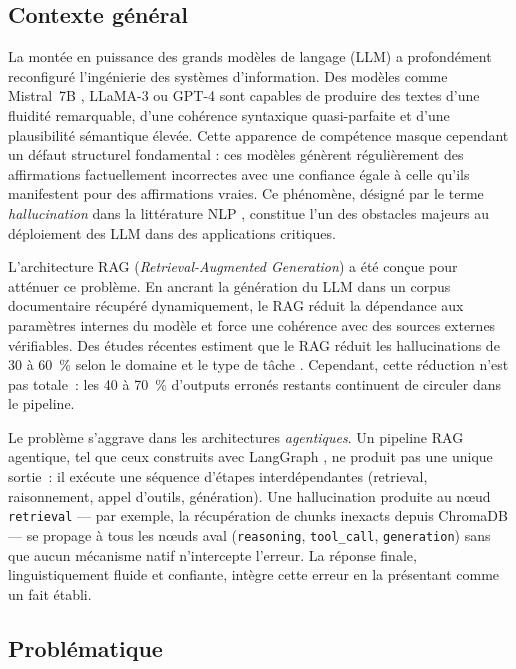 \documentclass[12pt,a4paper]{article}
\begin{document}
\subsection{Contexte général}

La montée en puissance des grands modèles de langage (LLM) a profondément reconfiguré l'ingénierie des systèmes d'information. Des modèles comme Mistral~7B \cite{jiang2023mistral}, LLaMA-3 ou GPT-4 sont capables de produire des textes d'une fluidité remarquable, d'une cohérence syntaxique quasi-parfaite et d'une plausibilité sémantique élevée. Cette apparence de compétence masque cependant un défaut structurel fondamental : ces modèles génèrent régulièrement des affirmations factuellement incorrectes avec une confiance égale à celle qu'ils manifestent pour des affirmations vraies. Ce phénomène, désigné par le terme \textit{hallucination} dans la littérature NLP \cite{maynez2020faithfulness, ji2023survey}, constitue l'un des obstacles majeurs au déploiement des LLM dans des applications critiques.

L'architecture RAG (\textit{Retrieval-Augmented Generation}) \cite{lewis2020retrieval} a été conçue pour atténuer ce problème. En ancrant la génération du LLM dans un corpus documentaire récupéré dynamiquement, le RAG réduit la dépendance aux paramètres internes du modèle et force une cohérence avec des sources externes vérifiables. Des études récentes estiment que le RAG réduit les hallucinations de 30 à 60~\% selon le domaine et le type de tâche \cite{shuster2021retrieval, zhang2023siren}. Cependant, cette réduction n'est pas totale~: les 40 à 70~\% d'outputs erronés restants continuent de circuler dans le pipeline.

Le problème s'aggrave dans les architectures \textit{agentiques}. Un pipeline RAG agentique, tel que ceux construits avec LangGraph \cite{langgraph2024}, ne produit pas une unique sortie~: il exécute une séquence d'étapes interdépendantes (retrieval, raisonnement, appel d'outils, génération). Une hallucination produite au nœud \texttt{retrieval} --- par exemple, la récupération de chunks inexacts depuis ChromaDB --- se propage à tous les nœuds aval (\texttt{reasoning}, \texttt{tool\_call}, \texttt{generation}) sans que aucun mécanisme natif n'intercepte l'erreur. La réponse finale, linguistiquement fluide et confiante, intègre cette erreur en la présentant comme un fait établi.

\subsection{Problématique}
\end{document}
